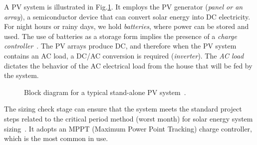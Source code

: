 \documentclass[runningheads]{llncs}
\begin{document}
A PV system is illustrated in Fig.\ref{fig:blockdiagram}. It employs the PV generator (\textit{panel or an array}), a semiconductor device that can convert solar energy into DC electricity. For night hours or rainy days, we hold \textit{batteries}, where power can be stored and used. The use of batteries as a storage form implies the presence of a \textit{charge controller}~\cite{Hansen}. The PV arrays produce DC, and therefore when the PV system contains an AC load, a DC/AC conversion is required (\textit{inverter}). The \textit{AC load} dictates the behavior of the AC electrical load from the house that will be fed by the system.
%
\begin{figure}[h]
\centering
\caption{Block diagram for a typical stand-alone PV system~\cite{Hansen}.}
\label{fig:blockdiagram} 
\end{figure}

The sizing check stage can ensure that the system meets the standard project steps related to the critical period method (worst month) for solar energy system sizing~\cite{Pinho}. It adopts an MPPT (Maximum Power Point Tracking) charge controller, which is the most common in use. 
\end{document}
